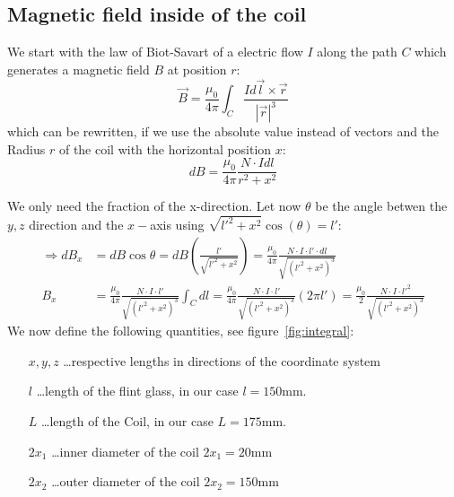 \subsection{Magnetic field inside of the coil}
We start with the law of Biot-Savart of a electric flow $I$ along the path $C$ which generates
a magnetic field $B$ at position $r$:
\begin{equation}
    \vec{B} = \frac{\mu_0}{4\pi} \int_{C} \frac{I d\vec{l} \times \vec{r}}{|\vec{r}|^3} 
\end{equation}
which can be rewritten, if we use the absolute value instead of vectors and the Radius $r$ of the
coil with the horizontal position $x$:
\begin{equation}
    dB = \frac{\mu_0}{4\pi} \frac{N \cdot I dl}{r^2 + x^2} 
\end{equation}

We only need the fraction of the x-direction. Let now $\theta$ be the angle betwen the $y,z$ 
direction and the $x-$axis using $\sqrt{{l'}^2 + x^2} \cos(\theta) = {l'}$:
\begin{align}
    \Rightarrow dB_x &= dB \cos\theta = dB \left (\frac{{l'}}{\sqrt{{l'}^2 + x^2}} \right) = 
    \frac{\mu_0}{4\pi} \frac{N\cdot I  \cdot {l'} \cdot dl}{\sqrt{\left ({l'}^2 + x^2 \right )^3}} \\
    B_x &= \frac{\mu_0}{4\pi} \frac{N\cdot I  \cdot {l'}}{\sqrt{\left ({l'}^2 + x^2 \right )^3}} \int_C dl 
  = \frac{\mu_0}{4\pi} \frac{N\cdot I  \cdot {l'}}{\sqrt{\left ({l'}^2 + x^2 \right )^3}} \left (2\pi {l'} \right )
  =  \frac{\mu_0}{2} \frac{N\cdot I  \cdot {l'}^2}{\sqrt{\left ({l'}^2 + x^2 \right )^3}} 
\end{align}
We now define the following quantities, see figure~\ref{fig:integral}: 
\begin{itemize}
\setlength\itemsep{0.0mm}
    \item[$x,y,z$] \ldots respective lengths in directions of the coordinate system 
    \item[$l$]     \ldots length of the flint glass, in our case $l=150$mm.
    \item[$L$]     \ldots length of the Coil, in our case $L=175$mm.
    \item[$2x_1$]  \ldots inner diameter of the coil $2x_1=20$mm
    \item[$2x_2$]  \ldots outer diameter of the coil $2x_2=150$mm 
\end{itemize}

